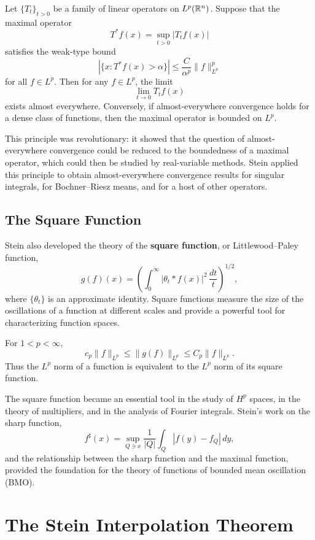 \begin{theorem}
Let \(\{T_t\}_{t>0}\) be a family of linear operators on \(L^p(\mathbb{R}^n)\). Suppose that the maximal operator
\[
T^*f(x) = \sup_{t>0} |T_t f(x)|
\]
satisfies the weak-type bound
\[
|\{x : T^*f(x) > \alpha\}| \leq \frac{C}{\alpha^p} \|f\|_{L^p}^p
\]
for all \(f \in L^p\). Then for any \(f \in L^p\), the limit
\[
\lim_{t \to 0} T_t f(x)
\]
exists almost everywhere. Conversely, if almost-everywhere convergence holds for a dense class of functions, then the maximal operator is bounded on \(L^p\).
\end{theorem}

This principle was revolutionary: it showed that the question of almost-everywhere convergence could be reduced to the boundedness of a maximal operator, which could then be studied by real-variable methods. Stein applied this principle to obtain almost-everywhere convergence results for singular integrals, for Bochner--Riesz means, and for a host of other operators.

\subsection{The Square Function}

Stein also developed the theory of the \textbf{square function}, or Littlewood--Paley function,
\[
g(f)(x) = \left( \int_0^\infty |\theta_t * f(x)|^2 \,\frac{dt}{t} \right)^{1/2},
\]
where \(\{\theta_t\}\) is an approximate identity. Square functions measure the size of the oscillations of a function at different scales and provide a powerful tool for characterizing function spaces.

\begin{theorem}
For \(1 < p < \infty\),
\[
c_p \|f\|_{L^p} \leq \|g(f)\|_{L^p} \leq C_p \|f\|_{L^p}.
\]
Thus the \(L^p\) norm of a function is equivalent to the \(L^p\) norm of its square function.
\end{theorem}

The square function became an essential tool in the study of \(H^p\) spaces, in the theory of multipliers, and in the analysis of Fourier integrals. Stein's work on the sharp function,
\[
f^\sharp(x) = \sup_{Q \ni x} \frac{1}{|Q|} \int_Q |f(y) - f_Q|\,dy,
\]
and the relationship between the sharp function and the maximal function, provided the foundation for the theory of functions of bounded mean oscillation (BMO).

\section{The Stein Interpolation Theorem}

